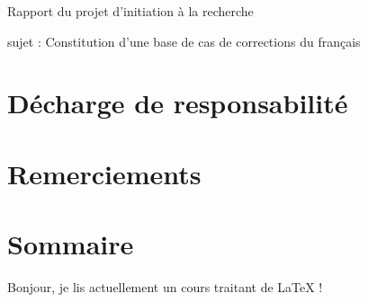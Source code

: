 \documentclass{article}
\begin{document}
\vspace*{100mm}
\begin{center}
	{\Huge Rapport du projet d'initiation \`{a} la recherche}
\end{center}
\cleardoublepage


sujet : Constitution d’une base de cas de corrections du fran\c{c}ais

\section{D\'echarge de responsabilit\'e}

\section{Remerciements}

\section{Sommaire}

Bonjour, je lis actuellement un cours traitant de LaTeX !
\end{document}
